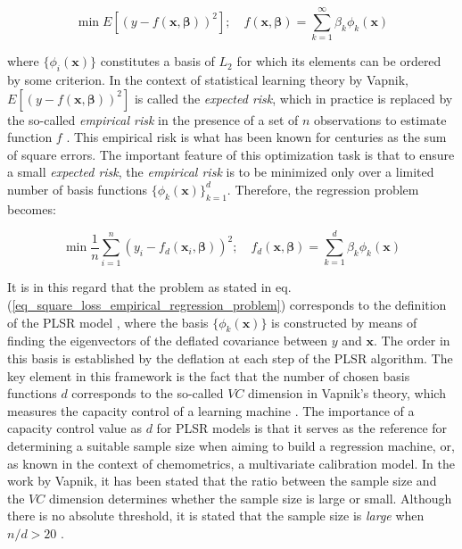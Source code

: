\documentclass[journal=ancham,manuscript=article]{achemso}
\begin{document}
\begin{equation}
    \min E \left[ (y-f(\mathbf{x}, \boldsymbol{\beta}))^2\right]; \quad f(\mathbf{x}, \boldsymbol{\beta}) = \sum_{k=1}^{\infty} \beta_k \phi_{k}(\mathbf{x})
    \label{eq_general_regression_problem}
\end{equation}

where $\{\phi_{i}(\mathbf{x})\}$ constitutes a basis of $L_2$ for which its elements can be ordered by some criterion. In the context of statistical learning theory by Vapnik, $E \left[ (y-f(\mathbf{x}, \boldsymbol{\beta}))^2\right]$ is called the \emph{expected risk}, which in practice is replaced by the so-called \emph{empirical risk} in the presence of a set of $n$ observations to estimate function $f$ \cite{Vapnik2000}. This empirical risk is what has been known for centuries as the sum of square errors. The important feature of this optimization task is that to ensure a small \emph{expected risk}, the \emph{empirical risk} is to be minimized only over a limited number of basis functions $\{\phi_{k}(\mathbf{x})\}_{k=1}^d$. Therefore, the regression problem becomes:

\begin{equation}
    \min \frac{1}{n} \sum_{i=1}^n (y_i-f_d(\mathbf{x}_i, \boldsymbol{\beta}))^2; \quad f_d(\mathbf{x}, \boldsymbol{\beta}) = \sum_{k=1}^{d} \beta_k \phi_{k}(\mathbf{x})
    \label{eq_square_loss_empirical_regression_problem}
\end{equation}

It is in this regard that the problem as stated in eq. (\ref{eq_square_loss_empirical_regression_problem}) corresponds to the definition of the PLSR model  \cite{Stone1990}, where the basis $\{\phi_{k}(\mathbf{x})\}$ is constructed by means of finding the eigenvectors of the deflated covariance between $y$ and $\mathbf{x}$. The order in this basis is established by the deflation at each step of the PLSR algorithm. The key element in this framework is the fact that the number of chosen basis functions $d$ corresponds to the so-called $VC$ dimension in Vapnik's theory, which measures the capacity control of a learning machine \cite{Vapnik2019}. The importance of a capacity control value as $d$ for PLSR models is that it serves as the reference for determining a suitable sample size when aiming to build a regression machine, or, as known in the context of chemometrics, a multivariate calibration model. In the work by Vapnik, it has been stated that the ratio between the sample size and the $VC$ dimension determines whether the sample size is large or small. Although there is no absolute threshold, it is stated that the sample size is \emph{large} when  $n/d>20$ \cite{Vapnik2000}.
\end{document}
